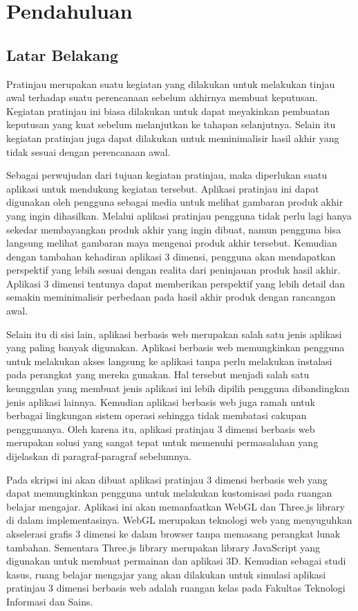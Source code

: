 \chapter{Pendahuluan}
\label{chap:intro}
   
\section{Latar Belakang}
\label{sec:label}

Pratinjau merupakan suatu kegiatan yang dilakukan untuk melakukan tinjau awal terhadap suatu perencanaan sebelum akhirnya membuat keputusan. Kegiatan pratinjau ini biasa dilakukan untuk dapat meyakinkan pembuatan keputusan yang kuat sebelum melanjutkan ke tahapan selanjutnya. Selain itu kegiatan pratinjau juga dapat dilakukan untuk meminimalisir hasil akhir yang tidak sesuai dengan perencanaan awal.

Sebagai perwujudan dari tujuan kegiatan pratinjau, maka diperlukan suatu aplikasi untuk mendukung kegiatan tersebut. Aplikasi pratinjau ini dapat digunakan oleh pengguna sebagai media untuk melihat gambaran produk akhir yang ingin dihasilkan. Melalui aplikasi pratinjau pengguna tidak perlu lagi hanya sekedar membayangkan produk akhir yang ingin dibuat, namun pengguna bisa langsung melihat gambaran maya mengenai produk akhir tersebut. Kemudian dengan tambahan kehadiran aplikasi 3 dimensi, pengguna akan mendapatkan perspektif yang lebih sesuai dengan realita dari peninjauan produk hasil akhir. Aplikasi 3 dimensi tentunya dapat memberikan perspektif yang lebih detail dan semakin meminimalisir perbedaan pada hasil akhir produk dengan rancangan awal.

Selain itu di sisi lain, aplikasi berbasis web merupakan salah satu jenis aplikasi yang paling banyak digunakan. Aplikasi berbasis web memungkinkan pengguna untuk melakukan akses langsung ke aplikasi tanpa perlu melakukan instalasi pada perangkat yang mereka gunakan. Hal tersebut menjadi salah satu keunggulan yang membuat jenis aplikasi ini lebih dipilih pengguna dibandingkan jenis aplikasi lainnya. Kemudian aplikasi berbasis web juga ramah untuk berbagai lingkungan sistem operasi sehingga tidak membatasi cakupan penggunanya. Oleh karena itu, aplikasi pratinjau 3 dimensi berbasis web merupakan solusi yang sangat tepat untuk memenuhi permasalahan yang dijelaskan di paragraf-paragraf sebelumnya.

Pada skripsi ini akan dibuat aplikasi pratinjau 3 dimensi berbasis web yang dapat memungkinkan pengguna untuk melakukan kustomisasi pada ruangan belajar mengajar. Aplikasi ini akan memanfaatkan WebGL dan Three.js library di dalam implementasinya. WebGL merupakan teknologi web yang menyuguhkan akselerasi grafis 3 dimensi ke dalam browser tanpa memasang perangkat lunak tambahan. Sementara Three.js library merupakan library JavaScript yang digunakan untuk membuat permainan dan aplikasi 3D. Kemudian sebagai studi kasus, ruang belajar mengajar yang akan dilakukan untuk simulasi aplikasi pratinjau 3 dimensi berbasis web adalah ruangan kelas pada Fakultas Teknologi Informasi dan Sains.

